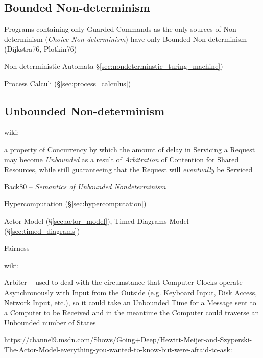 \subsection{Bounded Non-determinism}\label{sec:bounded_nondeterminism}

Programs containing only Guarded Commands as the only sources of
Non-determinism (\emph{Choice Non-determinism}) have only Bounded
Non-determinism (Dijkstra76, Plotkin76)

\fist Non-deterministic Automata
\S\ref{sec:nondeterminstic_turing_machine})

\fist Process Calculi (\S\ref{sec:process_calculus})



\subsection{Unbounded Non-determinism}
\label{sec:unbounded_nondeterminism}

wiki:

a property of Concurrency by which the amount of delay in Servicing a
Request may become \emph{Unbounded} as a result of \emph{Arbitration}
of Contention for Shared Resources, while still guaranteeing that the
Request will \emph{eventually} be Serviced

Back80 -- \emph{Semantics of Unbounded Nondeterminism}

\fist Hypercomputation (\S\ref{sec:hypercomputation})

\fist Actor Model (\S\ref{sec:actor_model}), Timed Diagrams Model
(\S\ref{sec:timed_diagrams})

Fairness

wiki:

Arbiter -- used to deal with the circumstance that Computer Clocks
operate Asynchronously with Input from the Outside (e.g. Keyboard
Input, Disk Access, Network Input, etc.), so it could take an
Unbounded Time for a Message sent to a Computer to be Received and in
the meantime the Computer could traverse an Unbounded number of States


\url{https://channel9.msdn.com/Shows/Going+Deep/Hewitt-Meijer-and-Szyperski-The-Actor-Model-everything-you-wanted-to-know-but-were-afraid-to-ask}:

